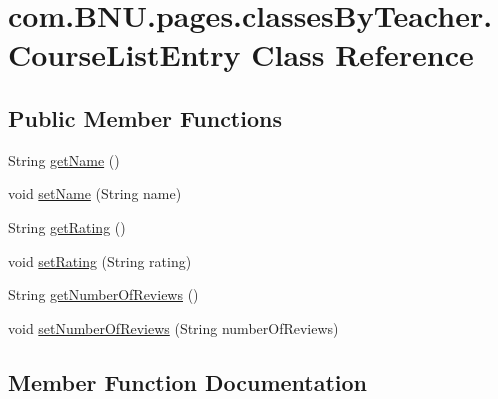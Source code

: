 \hypertarget{classcom_1_1_b_n_u_1_1pages_1_1classes_by_teacher_1_1_course_list_entry}{}\section{com.\+B\+N\+U.\+pages.\+classes\+By\+Teacher.\+Course\+List\+Entry Class Reference}
\label{classcom_1_1_b_n_u_1_1pages_1_1classes_by_teacher_1_1_course_list_entry}
\subsection*{Public Member Functions}
\begin{DoxyCompactItemize}
\item 
String \mbox{\hyperlink{classcom_1_1_b_n_u_1_1pages_1_1classes_by_teacher_1_1_course_list_entry_a7757df4e5bc1c9d603819f217d7ee1ce}{get\+Name}} ()
\item 
void \mbox{\hyperlink{classcom_1_1_b_n_u_1_1pages_1_1classes_by_teacher_1_1_course_list_entry_a14ce1fed5f6351dc231901e5801d67d2}{set\+Name}} (String name)
\item 
String \mbox{\hyperlink{classcom_1_1_b_n_u_1_1pages_1_1classes_by_teacher_1_1_course_list_entry_a12bd51b1ba6bc140e62702713c54bf7c}{get\+Rating}} ()
\item 
void \mbox{\hyperlink{classcom_1_1_b_n_u_1_1pages_1_1classes_by_teacher_1_1_course_list_entry_a5c23f2b0c3e61966080caf78a08d199a}{set\+Rating}} (String rating)
\item 
String \mbox{\hyperlink{classcom_1_1_b_n_u_1_1pages_1_1classes_by_teacher_1_1_course_list_entry_aa482a863bccf24b951e2d9a1839d57e7}{get\+Number\+Of\+Reviews}} ()
\item 
void \mbox{\hyperlink{classcom_1_1_b_n_u_1_1pages_1_1classes_by_teacher_1_1_course_list_entry_a909426def3524e7e59b5d84e362cebe2}{set\+Number\+Of\+Reviews}} (String number\+Of\+Reviews)
\end{DoxyCompactItemize}


\subsection{Member Function Documentation}
\mbox{\label{classcom_1_1_b_n_u_1_1pages_1_1classes_by_teacher_1_1_course_list_entry_a7757df4e5bc1c9d603819f217d7ee1ce}} 
